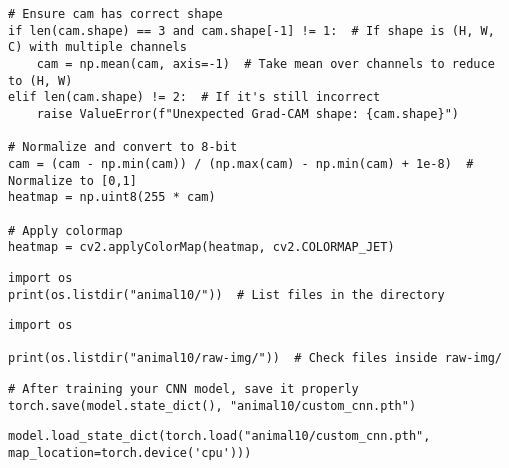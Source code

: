 \documentclass{article}
\begin{document}
\begin{verbatim}
# Ensure cam has correct shape
if len(cam.shape) == 3 and cam.shape[-1] != 1:  # If shape is (H, W, C) with multiple channels
    cam = np.mean(cam, axis=-1)  # Take mean over channels to reduce to (H, W)
elif len(cam.shape) != 2:  # If it's still incorrect
    raise ValueError(f"Unexpected Grad-CAM shape: {cam.shape}")

# Normalize and convert to 8-bit
cam = (cam - np.min(cam)) / (np.max(cam) - np.min(cam) + 1e-8)  # Normalize to [0,1]
heatmap = np.uint8(255 * cam)

# Apply colormap
heatmap = cv2.applyColorMap(heatmap, cv2.COLORMAP_JET)

\end{verbatim}

\begin{verbatim}
import os
print(os.listdir("animal10/"))  # List files in the directory

\end{verbatim}

\begin{verbatim}
import os

print(os.listdir("animal10/raw-img/"))  # Check files inside raw-img/

\end{verbatim}

\begin{verbatim}
# After training your CNN model, save it properly
torch.save(model.state_dict(), "animal10/custom_cnn.pth")

\end{verbatim}

\begin{verbatim}
model.load_state_dict(torch.load("animal10/custom_cnn.pth", map_location=torch.device('cpu')))

\end{verbatim}
\end{document}
